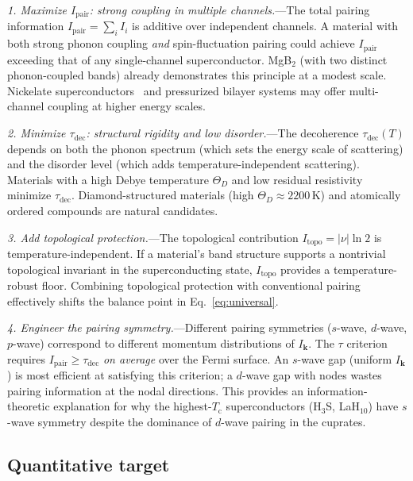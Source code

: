 \documentclass[prb,twocolumn,superscriptaddress,longbibliography,floatfix]{revtex4-2}
\newcommand{\tauasym}{\tau}
\newcommand{\taudec}{\tauasym_{\mathrm{dec}}}
\newcommand{\Ipair}{I_{\mathrm{pair}}}
\newcommand{\Tc}{T_{\mathrm{c}}}
\begin{document}
\textit{1. Maximize $\Ipair$: strong coupling in multiple
channels.}---The total pairing information
$\Ipair = \sum_i I_i$ is additive over independent channels.
A material with both strong phonon coupling \emph{and}
spin-fluctuation pairing could achieve $\Ipair$ exceeding that of
any single-channel superconductor.  MgB$_2$ (with two distinct
phonon-coupled bands) already demonstrates this principle at a
modest scale.  Nickelate superconductors~\cite{Li2019} and
pressurized bilayer systems may offer multi-channel coupling at
higher energy scales.

\textit{2. Minimize $\taudec$: structural rigidity and low
disorder.}---The decoherence $\taudec(T)$ depends on both the
phonon spectrum (which sets the energy scale of scattering) and
the disorder level (which adds temperature-independent scattering).
Materials with a high Debye temperature $\Theta_D$ and low
residual resistivity minimize $\taudec$.  Diamond-structured
materials (high $\Theta_D \approx 2200\,$K) and atomically
ordered compounds are natural candidates.

\textit{3. Add topological protection.}---The topological
contribution $I_{\mathrm{topo}} = |\nu| \ln 2$ is
temperature-independent.  If a material's band structure supports
a nontrivial topological invariant in the superconducting state,
$I_{\mathrm{topo}}$ provides a temperature-robust floor.
Combining topological protection with conventional pairing
effectively shifts the balance point in Eq.~\eqref{eq:universal}.

\textit{4. Engineer the pairing symmetry.}---Different
pairing symmetries ($s$-wave, $d$-wave, $p$-wave) correspond
to different momentum distributions of $I_{\bm{k}}$.
The $\tauasym$ criterion requires $\Ipair \geq \taudec$
\emph{on average} over the Fermi surface.  An $s$-wave
gap (uniform $I_{\bm{k}}$) is most efficient at satisfying
this criterion; a $d$-wave gap with nodes wastes pairing
information at the nodal directions.  This provides an
information-theoretic explanation for why the highest-$\Tc$
superconductors (H$_3$S, LaH$_{10}$) have $s$-wave symmetry
despite the dominance of $d$-wave pairing in the cuprates.

\subsection{Quantitative target}
\end{document}
